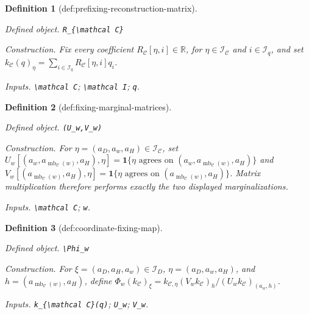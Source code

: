 \documentclass{article}
\newtheorem{definition}{Definition}
\begin{document}
\begin{definition}[def:prefixing-reconstruction-matrix]\label{def:prefixing-reconstruction-matrix}
\par\smallskip\noindent\emph{Defined object.} \texttt{R\_\allowbreak{}\{\textbackslash{}\allowbreak{}mathcal C\}\allowbreak{}}
\par\smallskip\noindent\emph{Construction.} Fix every coefficient \(R_{\mathcal C}[\eta,i]\in\mathbb R\), for \(\eta\in\mathcal I_{\mathcal C}\) and \(i\in\mathcal I_q\), and set \(k_{\mathcal C}(q)_\eta=\sum_{i\in\mathcal I_q}R_{\mathcal C}[\eta,i]q_i\).
\par\smallskip\noindent\emph{Inputs.} \texttt{\textbackslash{}\allowbreak{}mathcal C}; \texttt{\textbackslash{}\allowbreak{}mathcal I}; \texttt{q}.
\end{definition}

\begin{definition}[def:fixing-marginal-matrices]\label{def:fixing-marginal-matrices}
\par\smallskip\noindent\emph{Defined object.} \texttt{(U\_\allowbreak{}w,\allowbreak{}V\_\allowbreak{}w)}
\par\smallskip\noindent\emph{Construction.} For \(\eta=(a_D,a_w,a_H)\in\mathcal I_{\mathcal C}\), set \(U_w[(a_w,a_{\operatorname{mb}_{\mathcal C}(w)},a_H),\eta]=\mathbf 1\{\eta\text{ agrees on }(a_w,a_{\operatorname{mb}_{\mathcal C}(w)},a_H)\}\) and \(V_w[(a_{\operatorname{mb}_{\mathcal C}(w)},a_H),\eta]=\mathbf 1\{\eta\text{ agrees on }(a_{\operatorname{mb}_{\mathcal C}(w)},a_H)\}\). Matrix multiplication therefore performs exactly the two displayed marginalizations.
\par\smallskip\noindent\emph{Inputs.} \texttt{\textbackslash{}\allowbreak{}mathcal C}; \texttt{w}.
\end{definition}

\begin{definition}[def:coordinate-fixing-map]\label{def:coordinate-fixing-map}
\par\smallskip\noindent\emph{Defined object.} \texttt{\textbackslash{}\allowbreak{}Phi\_\allowbreak{}w}
\par\smallskip\noindent\emph{Construction.} For \(\xi=(a_D,a_H,a_w)\in\mathcal I_D\), \(\eta=(a_D,a_w,a_H)\), and \(h=(a_{\operatorname{mb}_{\mathcal C}(w)},a_H)\), define \(\Phi_w(k_{\mathcal C})_\xi=k_{\mathcal C,\eta}(V_wk_{\mathcal C})_h/(U_wk_{\mathcal C})_{(a_w,h)}\).
\par\smallskip\noindent\emph{Inputs.} \texttt{k\_\allowbreak{}\{\textbackslash{}\allowbreak{}mathcal C\}\allowbreak{}(q)}; \texttt{U\_\allowbreak{}w}; \texttt{V\_\allowbreak{}w}.
\end{definition}
\end{document}
